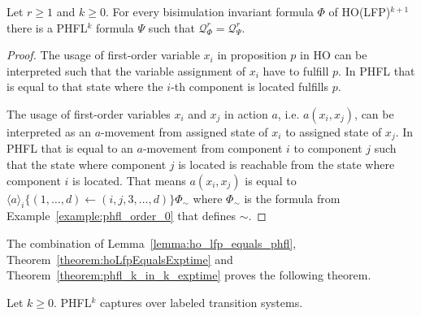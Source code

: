 \begin{lemma}
    \label{lemma:ho_lfp_equals_phfl}
    Let $r \geq 1$ and $k \geq 0$. For every bisimulation invariant formula $\Phi$ of HO(LFP)$^{k + 1}$ there is a
    PHFL$^k$ formula $\Psi$ such that $\mathcal{Q}_\Phi^r = \mathcal{Q}_\Psi^r$.
\end{lemma}

\begin{proof}
    The usage of first-order variable $x_i$ in proposition $p$ in HO can be interpreted such that the variable
    assignment of $x_i$ have to fulfill $p$. In PHFL that is equal to that state where the $i$-th component is
    located fulfills $p$.

    The usage of first-order variables $x_i$ and $x_j$ in action $a$, i.e. $a(x_i, x_j)$, can be interpreted as an
    $a$-movement from assigned state of $x_i$ to assigned state of $x_j$. In PHFL that is equal to an $a$-movement from
    component $i$ to component $j$ such that the state where component $j$ is located is reachable from the state where
    component $i$ is located. That means $a(x_i, x_j)$ is equal to $\langle a \rangle_i\{(1, \dots, d) \leftarrow (i, j,
    3, \dots, d)\} \Phi_\sim$ where $\Phi_\sim$ is the formula from Example~\ref{example:phfl_order_0} that defines $\sim$.
\end{proof}

The combination of Lemma~\ref{lemma:ho_lfp_equals_phfl}, Theorem~\ref{theorem:hoLfpEqualsExptime} and
Theorem~\ref{theorem:phfl_k_in_k_exptime} proves the following theorem.

\begin{theorem}
    Let $k \geq 0$. PHFL$^k$ captures  over labeled transition systems.
\end{theorem}

